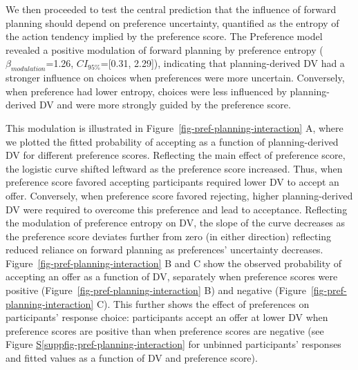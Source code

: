 \documentclass[
  letterpaper,
  DIV=11,
  numbers=noendperiod]{scrartcl}
\newcommand*\quartosuppfigref[1]{Figure \hyperref[#1]{S\ref{#1}}}
\begin{document}
We then proceeded to test the central prediction that the influence of
forward planning should depend on preference uncertainty, quantified as
the entropy of the action tendency implied by the preference score. The
Preference model revealed a positive modulation of forward planning by
preference entropy (\(\beta_{modulation}\)=1.26, \(CI_{95\%}\)={[}0.31,
2.29{]}), indicating that planning-derived DV had a stronger influence
on choices when preferences were more uncertain. Conversely, when
preference had lower entropy, choices were less influenced by
planning-derived DV and were more strongly guided by the preference
score.

This modulation is illustrated in
Figure~\ref{fig-pref-planning-interaction} A, where we plotted the
fitted probability of accepting as a function of planning-derived DV for
different preference scores. Reflecting the main effect of preference
score, the logistic curve shifted leftward as the preference score
increased. Thus, when preference score favored accepting participants
required lower DV to accept an offer. Conversely, when preference score
favored rejecting, higher planning-derived DV were required to overcome
this preference and lead to acceptance. Reflecting the modulation of
preference entropy on DV, the slope of the curve decreases as the
preference score deviates further from zero (in either direction)
reflecting reduced reliance on forward planning as preferences'
uncertainty decreases. Figure~\ref{fig-pref-planning-interaction} B and
C show the observed probability of accepting an offer as a function of
DV, separately when preference scores were positive
(Figure~\ref{fig-pref-planning-interaction} B) and negative
(Figure~\ref{fig-pref-planning-interaction} C). This further shows the
effect of preferences on participants' response choice: participants
accept an offer at lower DV when preference scores are positive than
when preference scores are negative (see
\quartosuppfigref{suppfig-pref-planning-interaction} for unbinned
participants' responses and fitted values as a function of DV and
preference score).
\end{document}
